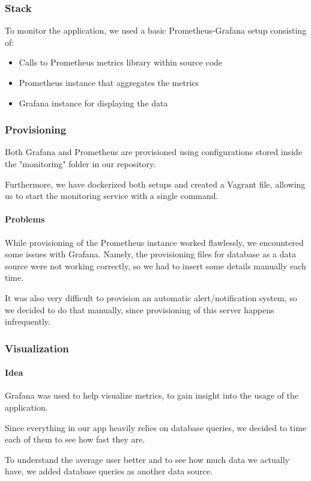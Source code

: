 \subsubsection{Stack}
To monitor the application, we used a basic Prometheus-Grafana setup consisting of:
\begin{itemize}
    \item Calls to Prometheus metrics library within source code 
    \item Prometheus instance that aggregates the metrics
    \item Grafana instance for displaying the data
\end{itemize}

\subsubsection{Provisioning}
Both Grafana and Prometheus are provisioned using configurations stored inside the "monitoring" folder in our repository.

Furthermore, we have dockerized both setups and created a Vagrant file, allowing us to start the monitoring service with a single command.
\paragraph{Problems}
While provisioning of the Prometheus instance worked flawlessly, we encountered some issues with Grafana. Namely, the provisioning files for database as a data source were not working correctly, so we had to insert some details manually each time.

It was also very difficult to provision an automatic alert/notification system, so we decided to do that manually, since provisioning of this server happens infrequently.

\subsubsection{Visualization}
\paragraph{Idea}
Grafana was used to help visualize metrics, to gain insight into the usage of the application.

Since everything in our app heavily relies on database queries, we decided to time each of them to see how fast they are. 

To understand the average user better and to see how much data we actually have, we added database queries as another data source.

